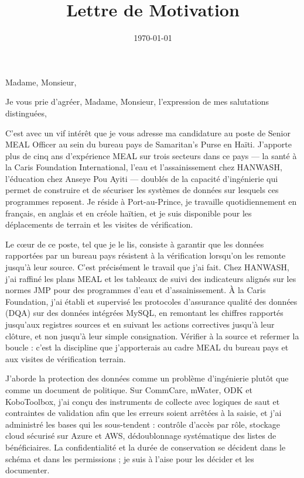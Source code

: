 \documentclass[11pt,a4paper,sans]{moderncv}
\title{Lettre de Motivation}
\begin{document}
\date{\today}
\opening{Madame, Monsieur,}
\closing{Je vous prie d'agréer, Madame, Monsieur, l'expression de mes salutations distinguées,}

\makelettertitle

C'est avec un vif intérêt que je vous adresse ma candidature au poste de Senior MEAL Officer au sein du bureau pays de Samaritan's Purse en Haïti. J'apporte plus de cinq ans d'expérience MEAL sur trois secteurs dans ce pays --- la santé à la Caris Foundation International, l'eau et l'assainissement chez HANWASH, l'éducation chez Anseye Pou Ayiti --- doublés de la capacité d'ingénierie qui permet de construire et de sécuriser les systèmes de données sur lesquels ces programmes reposent. Je réside à Port-au-Prince, je travaille quotidiennement en français, en anglais et en créole haïtien, et je suis disponible pour les déplacements de terrain et les visites de vérification.

Le cœur de ce poste, tel que je le lis, consiste à garantir que les données rapportées par un bureau pays résistent à la vérification lorsqu'on les remonte jusqu'à leur source. C'est précisément le travail que j'ai fait. Chez HANWASH, j'ai raffiné les plans MEAL et les tableaux de suivi des indicateurs alignés sur les normes JMP pour des programmes d'eau et d'assainissement. À la Caris Foundation, j'ai établi et supervisé les protocoles d'assurance qualité des données (DQA) sur des données intégrées MySQL, en remontant les chiffres rapportés jusqu'aux registres sources et en suivant les actions correctives jusqu'à leur clôture, et non jusqu'à leur simple consignation. Vérifier à la source et refermer la boucle : c'est la discipline que j'apporterais au cadre MEAL du bureau pays et aux visites de vérification terrain.

J'aborde la protection des données comme un problème d'ingénierie plutôt que comme un document de politique. Sur CommCare, mWater, ODK et KoboToolbox, j'ai conçu des instruments de collecte avec logiques de saut et contraintes de validation afin que les erreurs soient arrêtées à la saisie, et j'ai administré les bases qui les sous-tendent : contrôle d'accès par rôle, stockage cloud sécurisé sur Azure et AWS, dédoublonnage systématique des listes de bénéficiaires. La confidentialité et la durée de conservation se décident dans le schéma et dans les permissions ; je suis à l'aise pour les décider et les documenter.
\end{document}
